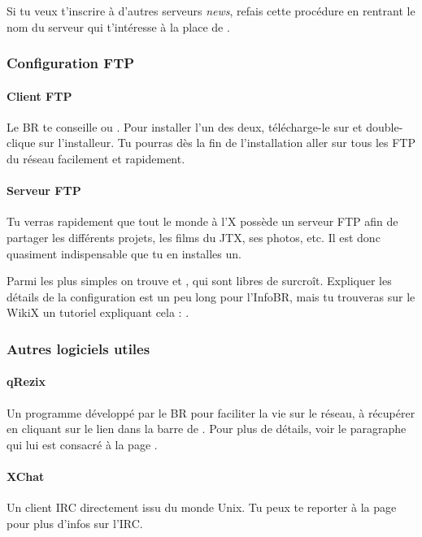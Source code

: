 Si tu veux t'inscrire \`a  d'autres serveurs \emph{news}, refais cette
proc\'edure en rentrant le nom du serveur qui t'int\'eresse \`a  la place
de \fkz.

\subsubsection{Configuration FTP}

\paragraph{Client FTP}
Le BR te conseille  ou . Pour installer l'un des deux, t\'el\'echarge-le sur  et double-clique sur l'installeur.
Tu pourras d\`es la fin de l'installation aller sur tous les FTP du r\'eseau
facilement et rapidement.

\paragraph{Serveur FTP}
Tu verras rapidement que tout le monde \`a  l'X poss\`ede un serveur FTP
afin de partager les diff\'erents projets, les films du JTX, ses
photos, etc. Il est donc quasiment indispensable que tu en installes
un.

Parmi les plus simples on trouve  et , qui sont libres de surcro\^{i}t. Expliquer les d\'etails de la configuration est un peu long pour l'InfoBR, mais tu trouveras sur le WikiX un tutoriel expliquant cela : .

\subsubsection{Autres logiciels utiles}

  \paragraph{qRezix} Un programme d\'evelopp\'e par le BR pour faciliter la vie sur le r\'eseau,
                  \`a  r\'ecup\'erer en cliquant sur le lien dans la barre de \fkz. Pour plus de d\'etails, voir le paragraphe qui lui est consacr\'e
                  \`a  la page \pageref{qrezix}.
                  
  \paragraph{XChat}  Un client IRC directement issu du monde Unix.
                 Tu peux te reporter \`a  la page \pageref{irc} pour plus d'infos sur l'IRC.
                 
